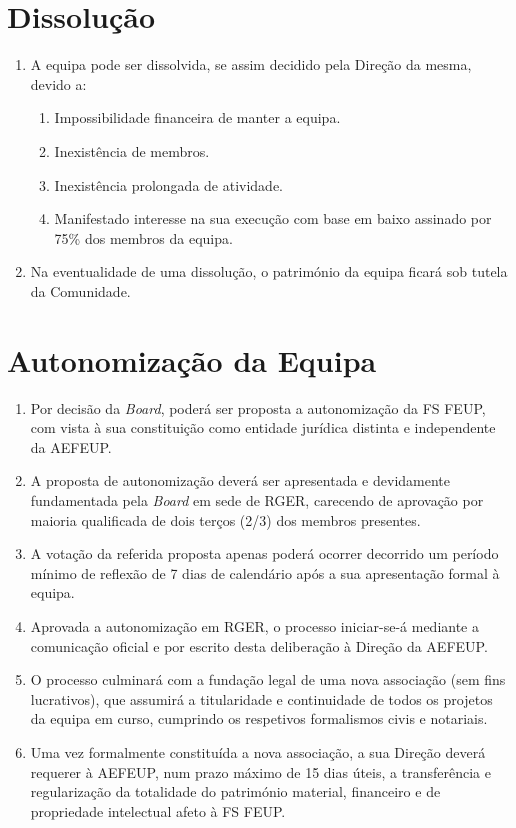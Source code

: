 \section{Dissolução}
\begin{enumerate}
  \item A equipa pode ser dissolvida, se assim decidido pela Direção da mesma, devido a:
  \begin{enumerate}
    \item Impossibilidade financeira de manter a equipa.
    \item Inexistência de membros.
    \item Inexistência prolongada de atividade.
    \item Manifestado interesse na sua execução com base em baixo assinado por 75\% dos membros da equipa.
  \end{enumerate}
  \item Na eventualidade de uma dissolução, o património da equipa ficará sob tutela da Comunidade.
\end{enumerate}

\section{Autonomização da Equipa}
\begin{enumerate}
  \item Por decisão da \textit{Board}, poderá ser proposta a autonomização da FS FEUP, com vista à sua constituição como entidade jurídica distinta e independente da AEFEUP.
  \item A proposta de autonomização deverá ser apresentada e devidamente fundamentada pela \textit{Board} em sede de RGER, carecendo de aprovação por maioria qualificada de dois terços (2/3) dos membros presentes.
  \item A votação da referida proposta apenas poderá ocorrer decorrido um período mínimo de reflexão de 7 dias de calendário após a sua apresentação formal à equipa.
  \item Aprovada a autonomização em RGER, o processo iniciar-se-á mediante a comunicação oficial e por escrito desta deliberação à Direção da AEFEUP.
  \item O processo culminará com a fundação legal de uma nova associação (sem fins lucrativos), que assumirá a titularidade e continuidade de todos os projetos da equipa em curso, cumprindo os respetivos formalismos civis e notariais.
  \item Uma vez formalmente constituída a nova associação, a sua Direção deverá requerer à AEFEUP, num prazo máximo de 15 dias úteis, a transferência e regularização da totalidade do património material, financeiro e de propriedade intelectual afeto à FS FEUP.
\end{enumerate}

